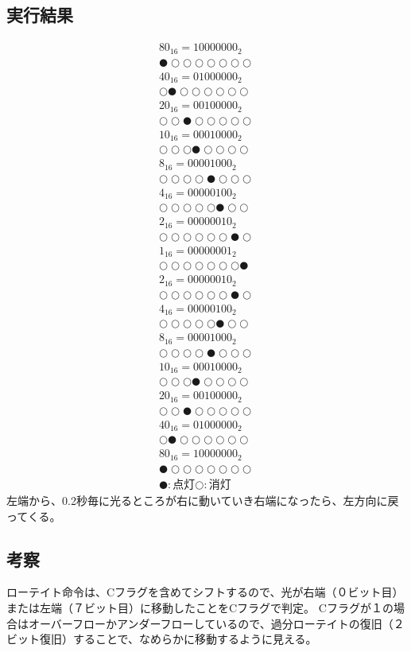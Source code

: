 \documentclass[a4paper,12pt]{ujarticle}
\begin{document}
  \subsection{実行結果}
  \begin{eqnarray*}
   {80}_{16} = 10000000_2 \\
   ●○○○○○○○ \\
   {40}_{16} = 01000000_2 \\
   ○●○○○○○○ \\
   {20}_{16} = 00100000_2 \\
   ○○●○○○○○ \\
   {10}_{16} = 00010000_2 \\
   ○○○●○○○○ \\
   {8}_{16}  = 00001000_2 \\
   ○○○○●○○○ \\
   {4}_{16}  = 00000100_2 \\
   ○○○○○●○○ \\
   {2}_{16}  = 00000010_2 \\
   ○○○○○○●○ \\
   {1}_{16}  = 00000001_2 \\
   ○○○○○○○● \\
   {2}_{16}  = 00000010_2 \\
   ○○○○○○●○ \\
   {4}_{16}  = 00000100_2 \\
   ○○○○○●○○ \\
   {8}_{16}  = 00001000_2 \\
   ○○○○●○○○ \\
   {10}_{16} = 00010000_2 \\
   ○○○●○○○○ \\
   {20}_{16} = 00100000_2 \\
   ○○●○○○○○ \\
   {40}_{16} = 01000000_2 \\
   ○●○○○○○○ \\
   {80}_{16} = 10000000_2 \\
   ●○○○○○○○ \\
   ●:点灯○:消灯
  \end{eqnarray*}
  左端から、0.2秒毎に光るところが右に動いていき右端になったら、左方向に戻ってくる。
  \subsection{考察}
  ローテイト命令は、Cフラグを含めてシフトするので、光が右端（０ビット目）または左端（７ビット目）に移動したことをCフラグで判定。
  Cフラグが１の場合はオーバーフローかアンダーフローしているので、過分ローテイトの復旧（２ビット復旧）することで、なめらかに移動するように見える。
\end{document}
